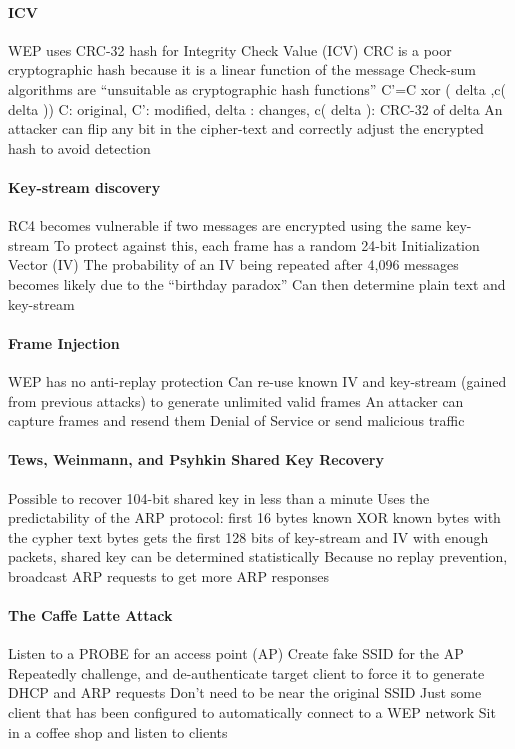 \documentclass[pdftex, 12pt, a4paper]{article}
\begin{document}
\paragraph{ICV}
WEP uses CRC-32 hash for Integrity Check Value (ICV)
CRC is a poor cryptographic hash because it is a linear function of the message
Check-sum algorithms are ``unsuitable as cryptographic hash functions''
C'=C xor ( delta ,c( delta ))
C: original, C': modified, delta : changes, c( delta ): CRC-32 of delta
An attacker can flip any bit in the
cipher-text and correctly adjust the encrypted hash to avoid detection

\paragraph{Key-stream discovery}
RC4 becomes vulnerable if two messages are encrypted using the same key-stream
To protect against this, each frame has a random 24-bit Initialization Vector (IV)
The probability of an IV being repeated after 4,096 messages becomes likely due to the ``birthday paradox''
Can then determine plain text and key-stream

\paragraph{Frame Injection}
WEP has no anti-replay protection
Can re-use known IV and key-stream (gained from previous attacks) to generate unlimited valid frames
An attacker can capture frames and resend them
Denial of Service or send malicious traffic

\paragraph{Tews, Weinmann, and Psyhkin Shared Key Recovery}
Possible to recover 104-bit shared key in less than a minute
Uses the predictability of the ARP protocol: first 16 bytes known
XOR known bytes with the cypher text bytes
gets the first 128 bits of key-stream and IV
with enough packets, shared key can be determined statistically
Because no replay prevention, broadcast ARP requests to get more ARP responses

\paragraph{The Caffe Latte Attack}
Listen to a PROBE for an access point (AP)
Create fake SSID for the AP
Repeatedly challenge, and de-authenticate target client to force it to generate DHCP and ARP requests
Don't need to be near the original SSID
Just some client that has been configured to automatically connect to a WEP network
Sit in a coffee shop and listen to clients
\end{document}
